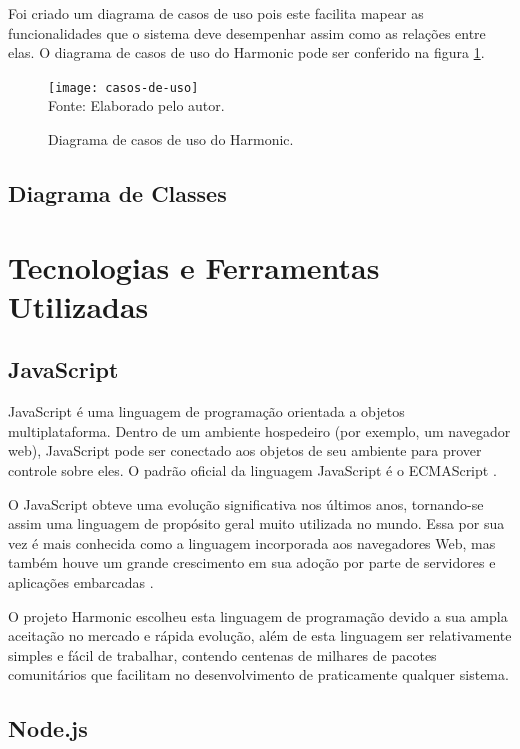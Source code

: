\documentclass[ppginf, pep]{esinucpel}
\begin{document}
Foi criado um diagrama de casos de uso pois este facilita mapear as funcionalidades que o sistema deve desempenhar assim como as relações entre elas. O diagrama de casos de uso do Harmonic pode ser conferido na figura \ref{fig:casos_de_uso}.

\begin{figure}[H]
    \centering
    \caption{Diagrama de casos de uso do Harmonic.}
    \vspace{5pt}
    \texttt{[image: casos-de-uso]}
    \\Fonte: Elaborado pelo autor.
    \label{fig:casos_de_uso}
\end{figure}

\section{Diagrama de Classes}

\chapter{Tecnologias e Ferramentas Utilizadas}

\section{JavaScript}

JavaScript é uma linguagem de programação orientada a objetos multiplataforma. Dentro de um ambiente hospedeiro (por exemplo, um navegador web), JavaScript pode ser conectado aos objetos de seu ambiente para prover controle sobre eles. O padrão oficial da linguagem JavaScript é o ECMAScript \cite{mdn_js_intro}.

O JavaScript obteve uma evolução significativa nos últimos anos, tornando-se assim uma linguagem de propósito geral muito utilizada no mundo. Essa por sua vez é mais conhecida como a linguagem incorporada aos navegadores Web, mas também houve um grande crescimento em sua adoção por parte de servidores e aplicações embarcadas \cite{es2015}.

O projeto Harmonic escolheu esta linguagem de programação devido a sua ampla aceitação no mercado e rápida evolução, além de esta linguagem ser relativamente simples e fácil de trabalhar, contendo centenas de milhares de pacotes comunitários que facilitam no desenvolvimento de praticamente qualquer sistema.

\section{Node.js}
\end{document}
